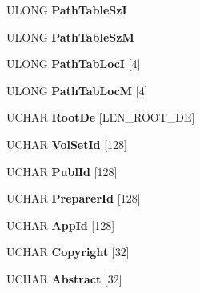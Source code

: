\begin{DoxyCompactItemize}
U\+L\+O\+NG {\bfseries Path\+Table\+SzI}
\item 
\mbox{\label{struct___r_a_w___h_s_g___v_d_a3072de4ef0480e3d1bfe15512fec1fe9}} 
U\+L\+O\+NG {\bfseries Path\+Table\+SzM}
\item 
\mbox{\label{struct___r_a_w___h_s_g___v_d_a25e94c33434729e916e108b7d5ad4354}} 
U\+L\+O\+NG {\bfseries Path\+Tab\+LocI} \mbox{[}4\mbox{]}
\item 
\mbox{\label{struct___r_a_w___h_s_g___v_d_afefc9194709fdcba1fdc88eb49b80516}} 
U\+L\+O\+NG {\bfseries Path\+Tab\+LocM} \mbox{[}4\mbox{]}
\item 
\mbox{\label{struct___r_a_w___h_s_g___v_d_af937fc73e474b3f5df3b6e795ea8ceaa}} 
U\+C\+H\+AR {\bfseries Root\+De} \mbox{[}L\+E\+N\+\_\+\+R\+O\+O\+T\+\_\+\+DE\mbox{]}
\item 
\mbox{\label{struct___r_a_w___h_s_g___v_d_a4e8cc5c199688c53168863648f4b38f0}} 
U\+C\+H\+AR {\bfseries Vol\+Set\+Id} \mbox{[}128\mbox{]}
\item 
\mbox{\label{struct___r_a_w___h_s_g___v_d_ae2369aa7279c69d19ab3ceab9ce40d19}} 
U\+C\+H\+AR {\bfseries Publ\+Id} \mbox{[}128\mbox{]}
\item 
\mbox{\label{struct___r_a_w___h_s_g___v_d_a49a43734653159d992d174fa999ab210}} 
U\+C\+H\+AR {\bfseries Preparer\+Id} \mbox{[}128\mbox{]}
\item 
\mbox{\label{struct___r_a_w___h_s_g___v_d_a93e281be4db4a7e4b3523ff1d728925d}} 
U\+C\+H\+AR {\bfseries App\+Id} \mbox{[}128\mbox{]}
\item 
\mbox{\label{struct___r_a_w___h_s_g___v_d_a376594eaecc154a8d4078b8a77f9b1ab}} 
U\+C\+H\+AR {\bfseries Copyright} \mbox{[}32\mbox{]}
\item 
\mbox{\label{struct___r_a_w___h_s_g___v_d_abe1ecf06b19198d441ccfdc89147318f}} 
U\+C\+H\+AR {\bfseries Abstract} \mbox{[}32\mbox{]}

\end{DoxyCompactItemize}
